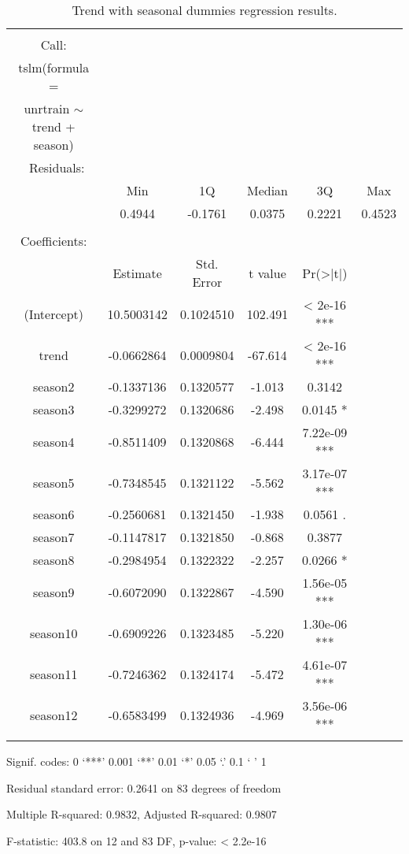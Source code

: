 \documentclass[12pt]{article}
\begin{document}
\break
\begin{table}[!htbp] \centering 
\begin{threeparttable}
  \caption{Trend with seasonal dummies regression results.} 
  \label{} 
\begin{tabular}{@{\extracolsep{5pt}} cccccc} 
 \toprule
\\[-1.8ex]\hline 
\hline \\[-1.8ex] 
Call: \\
tslm(formula = \\
unrtrain $\sim$ trend + season) \\
\midrule\
Residuals: \\
 & Min   &    1Q  & Median  &     3Q  &    Max \\
& 0.4944 & -0.1761 &  0.0375 &   0.2221  & 0.4523 \\
\\
Coefficients: \\
     &         Estimate & Std. Error & t value & Pr(>|t|)    \\
(Intercept) & 10.5003142 &  0.1024510 & 102.491 &  < 2e-16 *** \\
trend    &    -0.0662864  & 0.0009804 & -67.614  & < 2e-16 *** \\
season2  &    -0.1337136  & 0.1320577  & -1.013   & 0.3142    \\
season3   &   -0.3299272  & 0.1320686  & -2.498 &   0.0145 * \\ 
season4  &    -0.8511409  & 0.1320868  & -6.444 & 7.22e-09 *** \\
season5  &    -0.7348545 &   0.1321122 &  -5.562 & 3.17e-07 *** \\
season6  &    -0.2560681 &  0.1321450 &  -1.938  &  0.0561 .  \\
season7   &   -0.1147817  & 0.1321850  & -0.868  &  0.3877    \\
season8   &   -0.2984954 &  0.1322322  & -2.257  &  0.0266 * \\  
season9  &    -0.6072090  & 0.1322867  & -4.590 & 1.56e-05 *** \\
season10  &   -0.6909226 &  0.1323485  & -5.220 & 1.30e-06 *** \\
season11  &   -0.7246362 &  0.1324174  & -5.472 & 4.61e-07 *** \\
season12  &   -0.6583499 &  0.1324936  & -4.969 & 3.56e-06 *** \\
\hline \\[-1.8ex] 
\bottomrule
 \end{tabular}
 \begin{tablenotes}
      \small
      \item Signif. codes:  0 ‘***’ 0.001 ‘**’ 0.01 ‘*’ 0.05 ‘.’ 0.1 ‘ ’ 1
\item Residual standard error: 0.2641 on 83 degrees of freedom
\item Multiple R-squared:  0.9832,	Adjusted R-squared:  0.9807  
\item F-statistic: 403.8 on 12 and 83 DF,  p-value: < 2.2e-16
\end{tablenotes}
  \end{threeparttable}
\end{table} 
\end{document}
